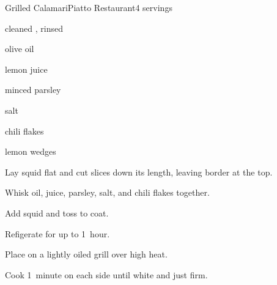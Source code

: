 \begin{recipe}{Grilled Calamari}{Piatto Restaurant}{4 servings}

\begin{ingredients}
\item {} cleaned , rinsed
\item \C{\quarter} olive oil
\item {} lemon juice
\item {} minced parsley
\item \tp{\half} salt
\item \tp{\half} chili flakes
\item lemon wedges
\end{ingredients}

\begin{directions}
\item Lay squid flat and cut \inch{\quarter} slices down its length, leaving \inch{\quarter} border at the top.
\item Whisk oil, juice, parsley, salt, and chili flakes together.
\item Add squid and toss to coat.
\item Refigerate for up to 1~hour.
\item Place on a lightly oiled grill over high heat.
\item Cook 1~minute on each side until white and just firm.
\end{directions}

\end{recipe}
